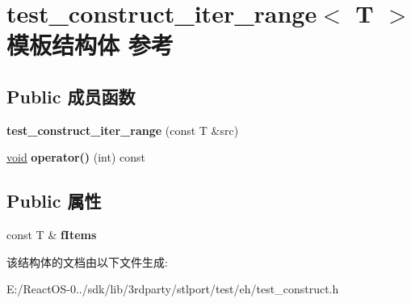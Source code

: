 \hypertarget{structtest__construct__iter__range}{}\section{test\+\_\+construct\+\_\+iter\+\_\+range$<$ T $>$ 模板结构体 参考}
\label{structtest__construct__iter__range}
\subsection*{Public 成员函数}
\begin{DoxyCompactItemize}
\item 
\mbox{\label{structtest__construct__iter__range_a65fc2547977f359fde64b5034073b9bb}} 
{\bfseries test\+\_\+construct\+\_\+iter\+\_\+range} (const T \&src)
\item 
\mbox{\label{structtest__construct__iter__range_a7c5360dd13239afc78265322e12899dd}} 
\hyperlink{interfacevoid}{void} {\bfseries operator()} (int) const
\end{DoxyCompactItemize}
\subsection*{Public 属性}
\begin{DoxyCompactItemize}
\item 
\mbox{\label{structtest__construct__iter__range_aecbf14720b4b450567dc37ef0bf7bb18}} 
const T \& {\bfseries f\+Items}
\end{DoxyCompactItemize}


该结构体的文档由以下文件生成\+:\begin{DoxyCompactItemize}
\item 
E\+:/\+React\+O\+S-\/0../sdk/lib/3rdparty/stlport/test/eh/test\+\_\+construct.\+h\end{DoxyCompactItemize}
